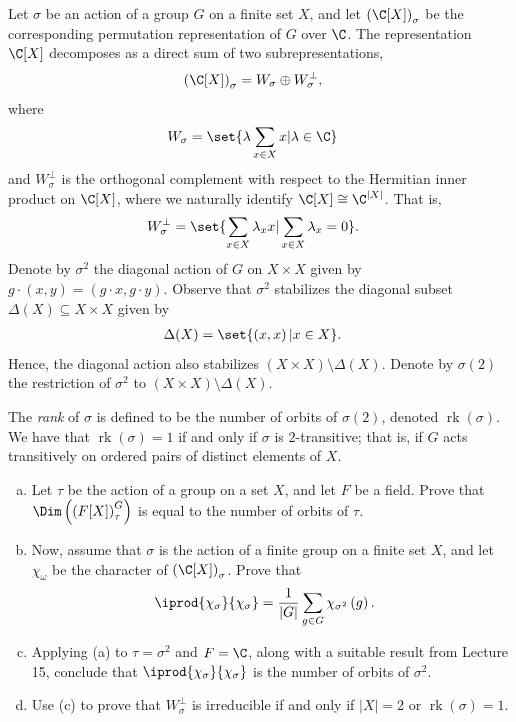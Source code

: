 \documentclass[10pt]{mypackage}
\begin{document}
\RaggedRight
\begin{problem}
  Let $\sigma$ be an action of a group $G$ on a finite set $X$, and let $\left( \C[X] \right)_{\sigma}$ be the corresponding permutation representation of $G$ over $\C$. The representation $\C[X]$ decomposes as a direct sum of two subrepresentations,
  \begin{align*}
    \left( \C[X] \right)_{\sigma} &= W_{\sigma} \oplus W_{\sigma}^{\perp},
  \end{align*}
  where
  \begin{align*}
    W_{\sigma} &= \set{\lambda \sum_{x\in X}x | \lambda\in \C}
  \end{align*}
  and $W_{\sigma}^{\perp}$ is the orthogonal complement with respect to the Hermitian inner product on $\C[X]$, where we naturally identify $\C[X]\cong \C^{\left\vert X \right\vert}$. That is,
  \begin{align*}
    W_{\sigma}^{\perp} &= \set{\sum_{x\in X}\lambda_x x | \sum_{x\in X}\lambda_x = 0}.
  \end{align*}
  Denote by $\sigma^2$ the diagonal action of $G$ on $X\times X$ given by $g\cdot \left( x,y \right) = \left( g\cdot x,g\cdot y \right)$. Observe that $\sigma^2$ stabilizes the diagonal subset $\Delta(X)\subseteq X\times X$ given by
  \begin{align*}
    \Delta(X) &= \set{\left( x,x \right) | x\in X}.
  \end{align*}
  Hence, the diagonal action also stabilizes $\left( X\times X \right)\setminus \Delta(X)$. Denote by $\sigma(2)$ the restriction of $\sigma^2$ to $\left( X\times X \right)\setminus \Delta(X)$.

  The \textit{rank} of $\sigma$ is defined to be the number of orbits of $\sigma(2)$, denoted $\operatorname{rk}(\sigma)$. We have that $\operatorname{rk}\left( \sigma \right) = 1$ if and only if $\sigma$ is $2$-transitive; that is, if $G$ acts transitively on ordered pairs of distinct elements of $X$.
  \begin{enumerate}[(a)]
    \item Let $\tau$ be the action of a group on a set $X$, and let $F$ be a field. Prove that $\Dim\left( \left( F[X] \right)_{\tau}^{G} \right)$ is equal to the number of orbits of $\tau$.
    \item Now, assume that $\sigma$ is the action of a finite group on a finite set $X$, and let $\chi_{\omega}$ be the character of $\left( \C[X] \right)_{\sigma}$. Prove that
      \begin{align*}
        \iprod{\chi_{\sigma}}{\chi_{\sigma}} &= \frac{1}{\left\vert G \right\vert}\sum_{g\in G} \chi_{\sigma^2}\left( g \right).
      \end{align*}
    \item Applying (a) to $\tau = \sigma^2$ and $F = \C$, along with a suitable result from Lecture 15, conclude that $ \iprod{\chi_{\sigma}}{\chi_{\sigma}} $ is the number of orbits of $\sigma^2$.
    \item Use (c) to prove that $W_{\sigma}^{\perp}$ is irreducible if and only if $\left\vert X \right\vert = 2$ or $\operatorname{rk}\left( \sigma \right) = 1$.
  \end{enumerate}
\end{problem}
\end{document}
